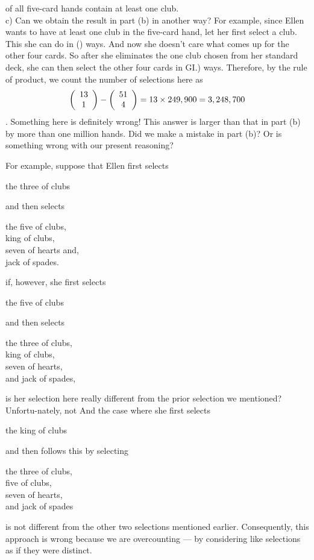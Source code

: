 \documentclass[11pt]{article}
\begin{document}
of all five-card hands contain at least one club.\\
c) Can we obtain the result in part (b) in another way? For example, since Ellen wants to 
have at least one club in the five-card hand, let her first select a club. This she can do in () 
ways. And now she doesn't care what comes up for the other four cards. So after she 
eliminates the one club chosen from her standard deck, she can then select the other four 
cards in GI.) ways. Therefore, by the rule of product, we count the number of selections 
here as 
$$ \left( {\begin{array}{*{20}c} 13  \\ 1  \\ \end{array}} \right) - \left( {\begin{array}{*{20}c} 51  \\ 4  \\ \end{array}} \right) = 13 \times 249,900 = 3,248,700  $$.
Something here is definitely wrong! This answer is larger than that in part (b) by more than one million hands. Did we make a mistake in part (b)? Or is something wrong with our present reasoning?

For example, suppose that Ellen first selects 
\begin{center}
the three of clubs
\end{center}
and then selects 
\begin{center}
the five of clubs,\\
king of clubs,\\
seven of hearts and,\\
 jack of spades. 
\end{center}
if, however, she first selects
\begin{center}
the five of clubs 
\end{center}
and then selects 
\begin{center}
the three of clubs, \\
king of clubs, \\
seven of hearts, \\
and jack of spades, \\
\end{center}
is her selection here really different from the prior selection we mentioned? Unfortu-nately, not And the case where she first selects 
\begin{center}
the king of clubs
\end{center}
and then follows this by selecting
\begin{center}
the three of clubs,\\
five of clubs,\\
seven of hearts, \\
and jack of spades \\
\end{center}
is not different from the other two selections mentioned earlier. Consequently, this approach is wrong because we are overcounting — by considering like selections as if they were distinct. 
\\
\end{document}
